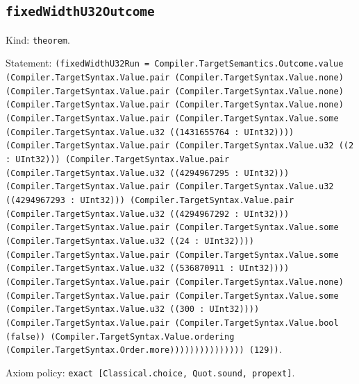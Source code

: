 \documentclass[11pt]{article}
\begin{document}
\subsection*{\texttt{fixedWidthU32Outcome}}
\noindent Kind: \texttt{theorem}.\par
\noindent Statement: \texttt{(fixedWidthU32Run = Compiler.TargetSemantics.Outcome.value (Compiler.TargetSyntax.Value.pair (Compiler.TargetSyntax.Value.none) (Compiler.TargetSyntax.Value.pair (Compiler.TargetSyntax.Value.none) (Compiler.TargetSyntax.Value.pair (Compiler.TargetSyntax.Value.none) (Compiler.TargetSyntax.Value.pair (Compiler.TargetSyntax.Value.some (Compiler.TargetSyntax.Value.u32 ((1431655764 : UInt32)))) (Compiler.TargetSyntax.Value.pair (Compiler.TargetSyntax.Value.u32 ((2 : UInt32))) (Compiler.TargetSyntax.Value.pair (Compiler.TargetSyntax.Value.u32 ((4294967295 : UInt32))) (Compiler.TargetSyntax.Value.pair (Compiler.TargetSyntax.Value.u32 ((4294967293 : UInt32))) (Compiler.TargetSyntax.Value.pair (Compiler.TargetSyntax.Value.u32 ((4294967292 : UInt32))) (Compiler.TargetSyntax.Value.pair (Compiler.TargetSyntax.Value.some (Compiler.TargetSyntax.Value.u32 ((24 : UInt32)))) (Compiler.TargetSyntax.Value.pair (Compiler.TargetSyntax.Value.some (Compiler.TargetSyntax.Value.u32 ((536870911 : UInt32)))) (Compiler.TargetSyntax.Value.pair (Compiler.TargetSyntax.Value.none) (Compiler.TargetSyntax.Value.pair (Compiler.TargetSyntax.Value.some (Compiler.TargetSyntax.Value.u32 ((300 : UInt32)))) (Compiler.TargetSyntax.Value.pair (Compiler.TargetSyntax.Value.bool (false)) (Compiler.TargetSyntax.Value.ordering (Compiler.TargetSyntax.Order.more))))))))))))))) (129))}.\par
\noindent Axiom policy: \texttt{exact [Classical.choice, Quot.sound, propext]}.\par
\end{document}
